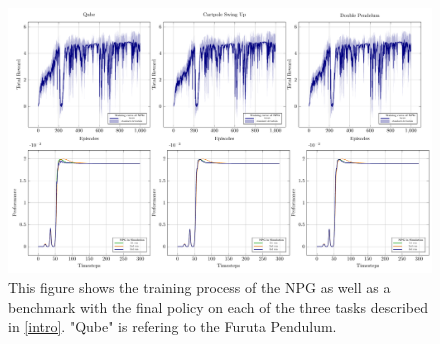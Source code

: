 \begin{figure}
\centering
\includegraphics[scale=.4]{plots/learned_benchmarked_NPG.pdf}
\caption{This figure shows the training process of the NPG as well as a benchmark with the final policy on each of the three tasks described in \autoref{intro}. "Qube" is refering to the Furuta Pendulum.}
\label{fig:NPG_final}
\end{figure}

